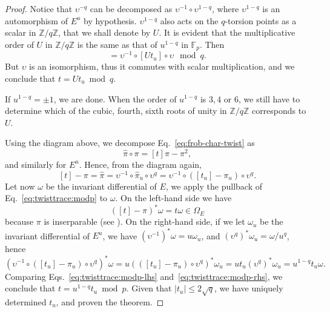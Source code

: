 \documentclass[12pt]{article}
\theoremstyle{plain}
\theoremstyle{definition}
\def\Z{\ensuremath{\mathbb{Z}}}
\def\F{\ensuremath{\mathbb{F}}}
\begin{document}
\begin{proof}
  Notice that $\upsilon^{-q}$ can be decomposed as
  $\upsilon^{-1}\circ\upsilon^{1-q}$, where $\upsilon^{1-q}$ is an
  automorphism of $E^u$ by hypothesis. $\upsilon^{1-q}$ also acts on
  the $q$-torsion points as a scalar in $\Z/q\Z$, that we shall denote
  by $U$. It is evident that the multiplicative order of $U$ in $\Z/q\Z$
  is the same as that of $u^{1-q}$ in $\F_p$. Then
  \begin{equation*}
    [t] = \upsilon^{-1}\circ[Ut_u]\circ\upsilon\mod q.
  \end{equation*}
  But $\upsilon$ is an isomorphism, thus it commutes with scalar
  multiplication, and we conclude that $t=Ut_u\bmod q$.

  If $u^{1-q}=\pm1$, we are done. When the order of $u^{1-q}$ is $3,4$
  or $6$, we still have to determine which of the cubic, fourth, sixth
  roots of unity in $\Z/q\Z$ corresponds to $U$.

  Using the diagram above, we decompose
  Eq.~\eqref{eq:frob-char-twist} as
  \begin{equation*}
    \hat\pi\circ\pi = [t]\pi - \pi^2,
  \end{equation*}
  and similarly for $E^u$. Hence, from the diagram again,
  \begin{equation}
    \label{eq:twisttrace:modp}
    [t] - \pi = \hat\pi = \upsilon^{-1}\circ\hat\pi_u\circ\upsilon^q 
    =  \upsilon^{-1}\circ([t_u] - \pi_u)\circ\upsilon^q.
  \end{equation}
  Let now $\omega$ be the invariant differential of $E$, we apply the
  pullback of Eq.~\eqref{eq:twisttrace:modp} to $\omega$. On the
  left-hand side we have
  \begin{equation}
    \label{eq:twisttrace:modp-lhs}
    ([t]-\pi)^\ast\omega = t\omega\in\Omega_E
  \end{equation}
  because $\pi$ is inserparable (see \cite[\S~5]{Sil}). On the
  right-hand side, if we let $\omega_u$ be the invariant differential
  of $E^u$, we have $(\upsilon^{-1})^\ast\omega=u\omega_u$, and
  $(\upsilon^q)^\ast\omega_u=\omega/u^q$, hence
  \begin{equation}
    \label{eq:twisttrace:modp-rhs}
    (\upsilon^{-1}\circ([t_u] - \pi_u)\circ\upsilon^q)^\ast\omega =
    u(([t_u] - \pi_u)\circ\upsilon^q)^\ast\omega_u =
    ut_u(\upsilon^q)^\ast\omega_u = u^{1-q}t_u\omega.
  \end{equation}
  Comparing Eqs.~\eqref{eq:twisttrace:modp-lhs}
  and~\eqref{eq:twisttrace:modp-rhs}, we conclude that $t = u^{1-q}t_u
  \bmod p$. Given that $\lvert t_u\rvert\le2\sqrt{q}$, we have uniquely determined $t_u$, and proven the theorem.
\end{proof}
\end{document}
